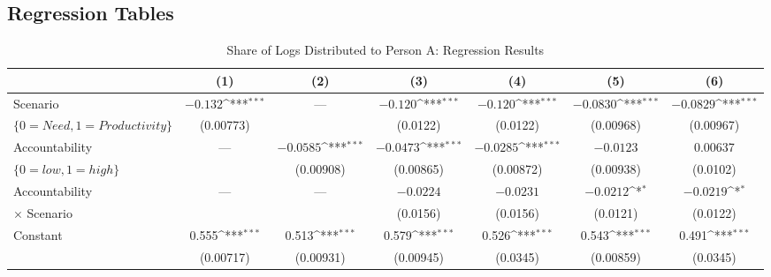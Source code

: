 \documentclass[smallcondensed]{svjour3}
\begin{document}
\subsection*{Regression Tables}
%
\newcommand{\rl}{\multicolumn{1}{c}{---}}
%
\begin{landscape}
\begin{table}[ht!]
\centering
\caption{Share of Logs Distributed to Person A: Regression Results}\label{tab:regression_share}
{\footnotesize
{
\def\sym#1{\ifmmode^{#1}\else\(^{#1}\)\fi}
\begin{tabularx}{16cm}{l*{6}{c}}\hline
                                 & \multicolumn{1}{c}{(1)}   & \multicolumn{1}{c}{(2)}   & \multicolumn{1}{c}{(3)}   & \multicolumn{1}{c}{(4)}   & \multicolumn{1}{c}{(5)}   &\multicolumn{1}{c}{(6)}   \\\hline\hline
   Scenario                      & $-0.132$\sym{***}         & \rl                       & $-0.120$\sym{***}         & $-0.120$\sym{***}         & $-0.0830$\sym{***}        &  $-0.0829$\sym{***}      \\
   $\{0=Need,1=Productivity\}$   &  (0.00773)                &                           &  (0.0122)                 &  (0.0122)                 &  (0.00968)                &   (0.00967)              \\
   [1em]
   Accountability                & \rl                       & $-0.0585$\sym{***}        & $-0.0473$\sym{***}        & $-0.0285$\sym{***}        & $-0.0123$                 &    0.00637               \\
   $\{0=low,1=high\}$            &                           &  (0.00908)                &  (0.00865)                &  (0.00872)                &  (0.00938)                &   (0.0102)               \\
   [1em]
   Accountability                & \rl                       & \rl                       & $-0.0224$                 & $-0.0231$                 & $-0.0212$\sym{*}          &  $-0.0219$\sym{*}        \\
   $\times$ Scenario             &                           &                           &  (0.0156)                 &  (0.0156)                 &  (0.0121)                 &   (0.0122)               \\
   [1em]
   Constant                      &   0.555\sym{***}          &   0.513\sym{***}          &   0.579\sym{***}          &   0.526\sym{***}          &   0.543\sym{***}          &    0.491\sym{***}        \\
                                 &  (0.00717)                &  (0.00931)                &  (0.00945)                &  (0.0345)                 &  (0.00859)                &   (0.0345)               \\\hline

\end{tabularx}}}
\end{table}
\end{landscape}
\end{document}

